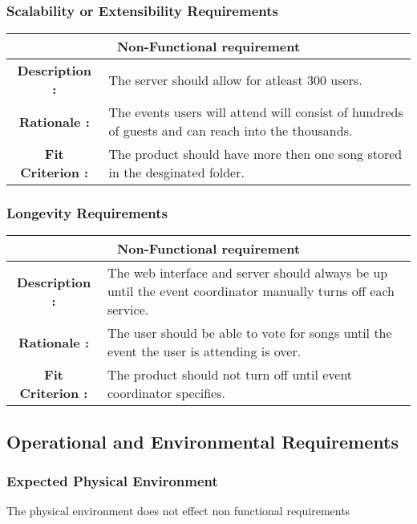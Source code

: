 \documentclass[12pt, titlepage]{article}
\begin{document}
\subsubsection{Scalability or Extensibility Requirements}
\begin{center}
\begin{table}[H]
\begin{tabularx}{\textwidth}{| c X |}
\hline
\multicolumn{2}{|c|}{\textbf{Non-Functional requirement}}\\
\hline
\textbf{Description : } &The server should allow for atleast 300 users.\\
\hline
\textbf{Rationale : } &The events users will attend will consist of hundreds of guests and can reach into the thousands. \\
\hline
\textbf{Fit Criterion : } & The product should have more then one song stored in the desginated folder. \\
\hline
\end{tabularx}
\end{table}
\end{center}
\subsubsection{Longevity Requirements}
\begin{center}
\begin{table}[H]
\begin{tabularx}{\textwidth}{| c X |}
\hline
\multicolumn{2}{|c|}{\textbf{Non-Functional requirement}}\\
\hline
\textbf{Description : } &The web interface and server should always be up until the event coordinator manually turns off each service.\\
\hline
\textbf{Rationale : } & The user should be able to vote for songs until the event the user is attending is over. \\
\hline
\textbf{Fit Criterion : } & The product should not turn off until event coordinator specifies. \\
\hline
\end{tabularx}
\end{table}
\end{center}

\subsection{Operational and Environmental Requirements}
\subsubsection{Expected Physical Environment}
The physical environment does not effect non functional requirements
\end{document}
